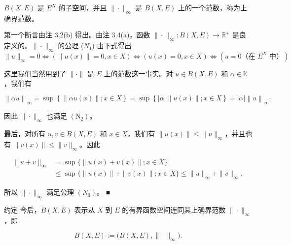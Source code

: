 \begin{proposition}

$ B(X,E) $ 是 $ E^X $ 的子空间，并且 $ \|\cdot\|_\infty $ 是 $ B(X,E) $ 上的一个范数，称为上确界范数。

\proofhead
第一个断言由注 3.2(b) 得出。由注 3.4(a)，函数 $ \|\cdot\|_\infty: B(X,E) \to \mathbb{R}^+ $ 是良定义的。$ \|\cdot\|_\infty $ 的公理 ($ N_1 $) 由下式得出
\[
\|u\|_{\infty}=0\Longleftrightarrow\left(\|u(x)\|=0,x\in X\right)\Longleftrightarrow\left(u(x)=0,x\in X\right)\Longleftrightarrow\left(u=0\text{（在 }E^{X}\text{ 中）}\right)
\]

这里我们当然用到了 $ \|\cdot\| $ 是 $ E $ 上的范数这一事实。对 $ u \in B(X, E) $ 和 $ \alpha \in \mathbb{K} $，我们有

\[
\left\|\alpha u\right\|_{\infty}=\sup\left\{\left\|\alpha u(x)\right\|;x\in X\right\}=\sup\left\{\left|\alpha\right|\left\|u(x)\right\|;x\in X\right\}=\left|\alpha\right|\left\|u\right\|_{\infty}.
\]

因此 $ \|\cdot\|_{\infty} $ 也满足 $ (\mathrm{N}_{2}) $。

最后，对所有 $ u, v \in B(X, E) $ 和 $ x \in X $，我们有 $ \|u(x)\| \leq \|u\|_\infty $，并且也有 $ \|v(x)\| \leq \|v\|_\infty $。因此

\begin{equation*}
\begin{aligned}
\|u+v\|_{\infty}&=\sup\big\{\|u(x)+v(x)\|;x\in X\big\}\\&\leq\sup\big\{\|u(x)\|+\|v(x)\|;x\in X\big\}\leq\|u\|_{\infty}+\|v\|_{\infty},
\end{aligned}
\end{equation*}

所以 $ \|\cdot\|_{\infty} $ 满足公理 $ (N_{3}) $。 ■

\end{proposition}

约定 今后，$ B(X,E) $ 表示从 $ X $ 到 $ E $ 的有界函数空间连同其上确界范数 $ \|\cdot\|_\infty $，即

\begin{equation}
B(X,E):=\big(B(X,E),\|\cdot\|_{\infty}\big).
\end{equation}

